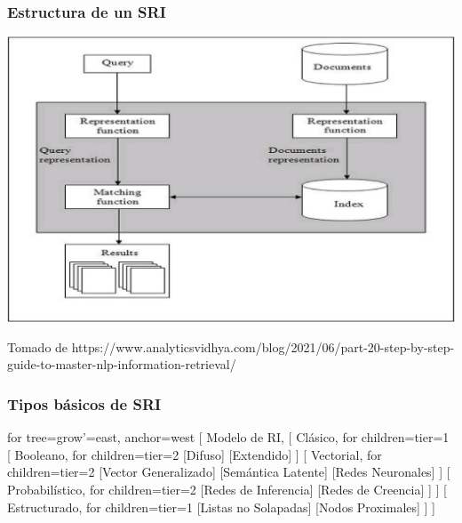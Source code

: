 \documentclass[
	10pt, %
	aspectratio=169, %
]{beamer}
\begin{document}

\begin{frame}
	
	\frametitle{Estructura de un SRI}
	
	\centering
	\includegraphics[scale=0.6]{sistema_basico.png} 
	
	{\scriptsize Tomado de https://www.analyticsvidhya.com/blog/2021/06/part-20-step-by-step-guide-to-master-nlp-information-retrieval/}
	
\end{frame}


\begin{frame}
	
	\frametitle{Tipos básicos de SRI}
	
	\centering
	\begin{forest}
		for tree={grow'=east, anchor=west}
		[ Modelo de RI, 
			[
				Clásico, 
				for children={tier=1} 
				[
					Booleano, 
					for children={tier=2} 
						[Difuso]
						[Extendido]
				]
				[
					Vectorial, 
					for children={tier=2} 
						[Vector Generalizado]
						[Semántica Latente]
						[Redes Neuronales]
				]
				[
				Probabilístico, 
				for children={tier=2} 
					[Redes de Inferencia]
					[Redes de Creencia]
				]
			] 
			[
				Estructurado, 
				for children={tier=1}
					[Listas no Solapadas]
					[Nodos Proximales]
			]
		]
	\end{forest}

\end{frame}

\end{document}
